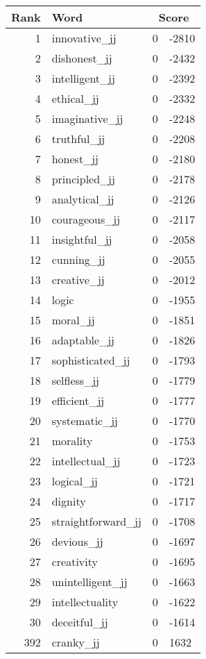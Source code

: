 \begin{longtable}[!htbp]{| rlr@{.}l |}
    \hline
    \textbf{Rank} & \textbf{Word} & \multicolumn{2}{c|}{\textbf{Score}} \\
    \hline
    \endhead
    1 & innovative\_jj & 0 & -2810 \\
    2 & dishonest\_jj & 0 & -2432 \\
    3 & intelligent\_jj & 0 & -2392 \\
    4 & ethical\_jj & 0 & -2332 \\
    5 & imaginative\_jj & 0 & -2248 \\
    6 & truthful\_jj & 0 & -2208 \\
    7 & honest\_jj & 0 & -2180 \\
    8 & principled\_jj & 0 & -2178 \\
    9 & analytical\_jj & 0 & -2126 \\
    10 & courageous\_jj & 0 & -2117 \\
    11 & insightful\_jj & 0 & -2058 \\
    12 & cunning\_jj & 0 & -2055 \\
    13 & creative\_jj & 0 & -2012 \\
    14 & logic & 0 & -1955 \\
    15 & moral\_jj & 0 & -1851 \\
    16 & adaptable\_jj & 0 & -1826 \\
    17 & sophisticated\_jj & 0 & -1793 \\
    18 & selfless\_jj & 0 & -1779 \\
    19 & efficient\_jj & 0 & -1777 \\
    20 & systematic\_jj & 0 & -1770 \\
    21 & morality & 0 & -1753 \\
    22 & intellectual\_jj & 0 & -1723 \\
    23 & logical\_jj & 0 & -1721 \\
    24 & dignity & 0 & -1717 \\
    25 & straightforward\_jj & 0 & -1708 \\
    26 & devious\_jj & 0 & -1697 \\
    27 & creativity & 0 & -1695 \\
    28 & unintelligent\_jj & 0 & -1663 \\
    29 & intellectuality & 0 & -1622 \\
    30 & deceitful\_jj & 0 & -1614 \\
    392 & cranky\_jj & 0 & 1632 \\

\end{longtable}
